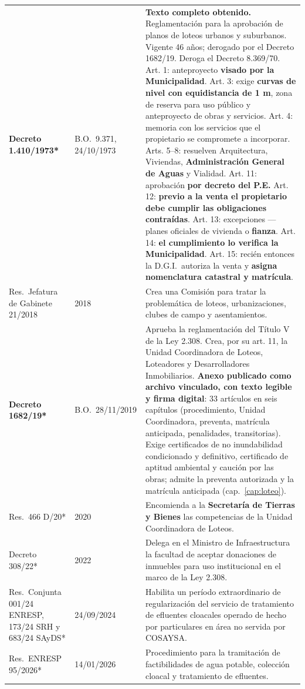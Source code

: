 \begin{longtable}{@{}p{3.2cm}p{1.9cm}p{7.9cm}@{}}
\textbf{Decreto 1.410/1973*} & B.O.\ 9.371, 24/10/1973 & \textbf{Texto completo obtenido.} Reglamentación para la aprobación de planos de loteos urbanos y suburbanos. Vigente 46 años; derogado por el Decreto 1682/19. Deroga el Decreto 8.369/70. Art. 1: anteproyecto \textbf{visado por la Municipalidad}. Art. 3: exige \textbf{curvas de nivel con equidistancia de 1 m}, zona de reserva para uso público y anteproyecto de obras y servicios. Art. 4: memoria con los servicios que el propietario se compromete a incorporar. Arts. 5--8: resuelven Arquitectura, Viviendas, \textbf{Administración General de Aguas} y Vialidad. Art. 11: aprobación \textbf{por decreto del P.E.} Art. 12: \textbf{previo a la venta el propietario debe cumplir las obligaciones contraídas}. Art. 13: excepciones --- planes oficiales de vivienda o \textbf{fianza}. Art. 14: \textbf{el cumplimiento lo verifica la Municipalidad}. Art. 15: recién entonces la D.G.I.\ autoriza la venta y \textbf{asigna nomenclatura catastral y matrícula}. \\
Res.\ Jefatura de Gabinete 21/2018 & 2018 & Crea una Comisión para tratar la problemática de loteos, urbanizaciones, clubes de campo y asentamientos. \\
\textbf{Decreto 1682/19*} & B.O.\ 28/11/2019 & Aprueba la reglamentación del Título V de la Ley 2.308. Crea, por su art. 11, la Unidad Coordinadora de Loteos, Loteadores y Desarrolladores Inmobiliarios. \textbf{Anexo publicado como archivo vinculado, con texto legible y firma digital}: 33 artículos en seis capítulos (procedimiento, Unidad Coordinadora, preventa, matrícula anticipada, penalidades, transitorias). Exige certificados de no inundabilidad condicionado y definitivo, certificado de aptitud ambiental y caución por las obras; admite la preventa autorizada y la matrícula anticipada (cap.\ \ref{cap:loteo}). \\
Res.\ 466 D/20* & 2020 & Encomienda a la \textbf{Secretaría de Tierras y Bienes} las competencias de la Unidad Coordinadora de Loteos. \\
Decreto 308/22* & 2022 & Delega en el Ministro de Infraestructura la facultad de aceptar donaciones de inmuebles para uso institucional en el marco de la Ley 2.308. \\
Res.\ Conjunta 001/24 ENRESP, 173/24 SRH y 683/24 SAyDS* & 24/09/2024 & Habilita un período extraordinario de regularización del servicio de tratamiento de efluentes cloacales operado de hecho por particulares en área no servida por COSAYSA. \\
Res.\ ENRESP 95/2026* & 14/01/2026 & Procedimiento para la tramitación de factibilidades de agua potable, colección cloacal y tratamiento de efluentes. \\
\bottomrule
\end{longtable}


